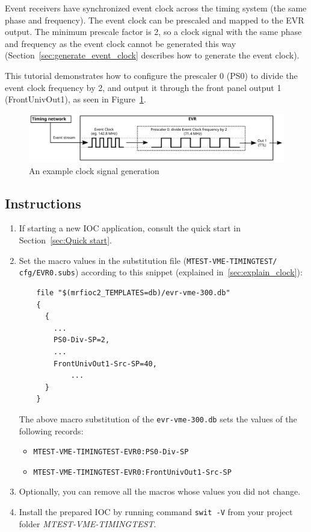 \documentclass[12pt,a4paper]{article}
\begin{document}
Event receivers have synchronized event clock across the timing system (the same phase and frequency). The event clock can be prescaled and mapped to the EVR output. The minimum prescale factor is 2, so a clock signal with the same phase and frequency as the event clock cannot be generated this way (Section~\ref{sec:generate_event_clock} describes how to generate the event clock).

This tutorial demonstrates how to configure the prescaler 0 (PS0) to divide the event clock frequency by 2, and output it through the front panel output 1 (FrontUnivOut1), as seen in Figure~\ref{fig:prescaler}. 

\begin{figure}[H]
	\centering
	\includegraphics[width=\columnwidth]{./img/prescaler}
	\caption{An example clock signal generation}
	\label{fig:prescaler}
\end{figure}

\subsection{Instructions}
\begin{enumerate}
	\item If starting a new IOC application, consult the quick start in Section~\ref{sec:Quick start}.

	\item Set the macro values in the substitution file (\texttt{MTEST-VME-TIMINGTEST/} \texttt{cfg/EVR0.subs}) according to this snippet (explained in~\ref{sec:explain_clock}):
\begin{verbatim}
	file "$(mrfioc2_TEMPLATES=db)/evr-vme-300.db"
	{
	  {
	    ...
	    PS0-Div-SP=2,
	    ...
	    FrontUnivOut1-Src-SP=40,
		    ...
	  }
	}
\end{verbatim}
	The above macro substitution of the \texttt{evr-vme-300.db} sets the values of the following records:
	\begin{itemize}
		\item \texttt{MTEST-VME-TIMINGTEST-EVR0:PS0-Div-SP}
		\item \texttt{MTEST-VME-TIMINGTEST-EVR0:FrontUnivOut1-Src-SP}
	\end{itemize}
	
	\item Optionally, you can remove all the macros whose values you did not change. 
	\item Install the prepared IOC by running command \texttt{swit -V} from your project folder \textit{MTEST-VME-TIMINGTEST}.
\end{enumerate}
\end{document}
